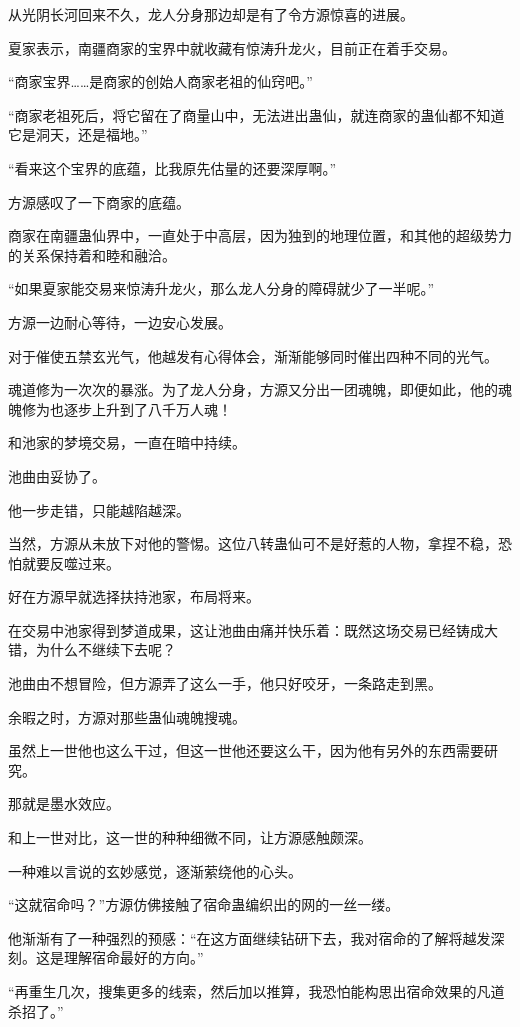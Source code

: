 \begin{this_body}
从光阴长河回来不久，龙人分身那边却是有了令方源惊喜的进展。

夏家表示，南疆商家的宝界中就收藏有惊涛升龙火，目前正在着手交易。

“商家宝界……是商家的创始人商家老祖的仙窍吧。”

“商家老祖死后，将它留在了商量山中，无法进出蛊仙，就连商家的蛊仙都不知道它是洞天，还是福地。”

“看来这个宝界的底蕴，比我原先估量的还要深厚啊。”

方源感叹了一下商家的底蕴。

商家在南疆蛊仙界中，一直处于中高层，因为独到的地理位置，和其他的超级势力的关系保持着和睦和融洽。

“如果夏家能交易来惊涛升龙火，那么龙人分身的障碍就少了一半呢。”

方源一边耐心等待，一边安心发展。

对于催使五禁玄光气，他越发有心得体会，渐渐能够同时催出四种不同的光气。

魂道修为一次次的暴涨。为了龙人分身，方源又分出一团魂魄，即便如此，他的魂魄修为也逐步上升到了八千万人魂！

和池家的梦境交易，一直在暗中持续。

池曲由妥协了。

他一步走错，只能越陷越深。

当然，方源从未放下对他的警惕。这位八转蛊仙可不是好惹的人物，拿捏不稳，恐怕就要反噬过来。

好在方源早就选择扶持池家，布局将来。

在交易中池家得到梦道成果，这让池曲由痛并快乐着：既然这场交易已经铸成大错，为什么不继续下去呢？

池曲由不想冒险，但方源弄了这么一手，他只好咬牙，一条路走到黑。

余暇之时，方源对那些蛊仙魂魄搜魂。

虽然上一世他也这么干过，但这一世他还要这么干，因为他有另外的东西需要研究。

那就是墨水效应。

和上一世对比，这一世的种种细微不同，让方源感触颇深。

一种难以言说的玄妙感觉，逐渐萦绕他的心头。

“这就宿命吗？”方源仿佛接触了宿命蛊编织出的网的一丝一缕。

他渐渐有了一种强烈的预感：“在这方面继续钻研下去，我对宿命的了解将越发深刻。这是理解宿命最好的方向。”

“再重生几次，搜集更多的线索，然后加以推算，我恐怕能构思出宿命效果的凡道杀招了。”


\end{this_body}
